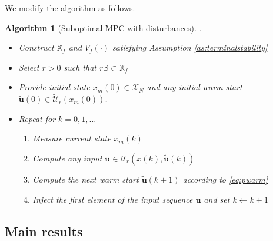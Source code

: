 \documentclass{article}
\newtheorem{algorithm}{Algorithm}
\begin{document}
We modify the algorithm as follows.
\begin{algorithm}[Suboptimal MPC with disturbances] .\\
\label{alg:psuboptimal}
\begin{itemize}
\item Construct $\mathbb{X}_f$ and $V_f(\cdot)$ satisfying Assumption \ref{as:terminalstability}
\item Select $r > 0$ such that $r\mathbb{B} \subset \mathbb{X}_f$
\item Provide initial state $x_m(0) \in \mathcal{X}_N$ 
and any initial warm start $\tilde{\mathbf{u}}(0) \in \tilde{\mathcal{U}}_r(x_m(0))$.
\item Repeat for $k = 0,1,\dots$
\begin{enumerate}
\item Measure current state $x_m(k)$
\item Compute any input $\mathbf{u} \in \mathcal{U}_r(x(k),\tilde{\mathbf{u}}(k))$
\item Compute the next warm start $\tilde{\mathbf{u}}(k+1)$ according to \eqref{eq:pwarm}
\item Inject the first element of the input sequence $\mathbf{u}$ and set $k \leftarrow k+1$  
\end{enumerate}
\end{itemize}
\end{algorithm}

\subsection{Main results}
\end{document}

